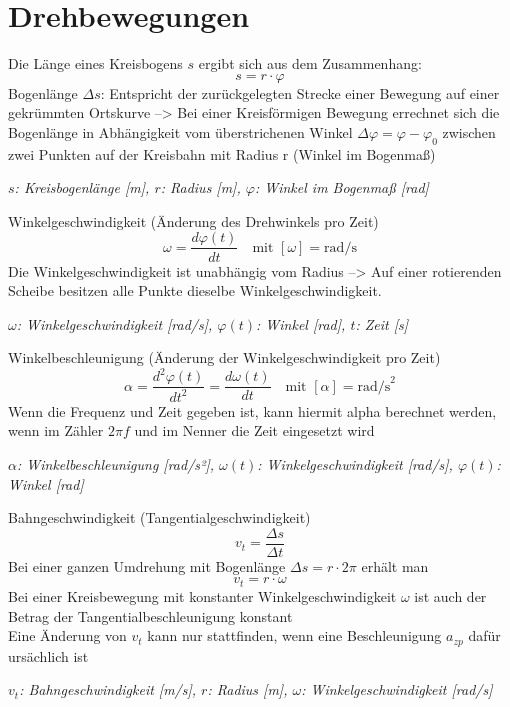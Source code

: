 \documentclass[a4paper,10pt]{article}
\newenvironment{displayformula}
{
	\begin{framed}
		\color{formulaColor}
	}
	{\end{framed}}
\newcommand{\formulalegend}[1]{%
	\par\vspace{0.5ex}%
	{{\color{legendColor}\RaggedRight\small\textit{#1}}}%
	\par\vspace{1.5ex}%
}
\begin{document}
\section{Drehbewegungen}


\begin{displayformula}
	Die Länge eines Kreisbogens \( s \) ergibt sich aus dem Zusammenhang:
	\[
	s = r \cdot \varphi 
	\]
	Bogenlänge $\Delta s$: Entspricht der zurückgelegten Strecke einer Bewegung auf einer gekrümmten Ortskurve --> Bei einer Kreisförmigen Bewegung errechnet sich die Bogenlänge in Abhängigkeit vom überstrichenen Winkel $\Delta \varphi = \varphi - \varphi_0$ zwischen zwei Punkten auf der Kreisbahn mit Radius r (Winkel im Bogenmaß)
\end{displayformula}
\formulalegend{
	\( s \): Kreisbogenlänge [m], \( r \): Radius [m], \( \varphi \): Winkel im Bogenmaß [rad]
}

\begin{displayformula}
	Winkelgeschwindigkeit (Änderung des Drehwinkels pro Zeit)
	\[
	\omega = \frac{d\varphi(t)}{dt} \quad \text{mit } [\omega] = \text{rad/s}
	\]
	Die Winkelgeschwindigkeit ist unabhängig vom Radius --> Auf einer rotierenden Scheibe besitzen alle Punkte dieselbe Winkelgeschwindigkeit.
\end{displayformula}
\formulalegend{
	\( \omega \): Winkelgeschwindigkeit [rad/s], \( \varphi(t) \): Winkel [rad], \( t \): Zeit [s]
}

\begin{displayformula}
	Winkelbeschleunigung (Änderung der Winkelgeschwindigkeit pro Zeit)
	\[
	\alpha = \frac{d^2 \varphi(t)}{dt^2} = \frac{d\omega(t)}{dt} \quad \text{mit } [\alpha] = \text{rad/s}^2
	\]
	Wenn die Frequenz und Zeit gegeben ist, kann hiermit alpha berechnet werden, wenn im Zähler $2 \pi f$ und im Nenner die Zeit eingesetzt wird
\end{displayformula}
\formulalegend{
	\( \alpha \): Winkelbeschleunigung [rad/s²], \( \omega(t) \): Winkelgeschwindigkeit [rad/s], \( \varphi(t) \): Winkel [rad]
}

\begin{displayformula}
	Bahngeschwindigkeit (Tangentialgeschwindigkeit)
	\[
	v_t = \frac{\Delta s}{\Delta t}
	\]
	Bei einer ganzen Umdrehung mit Bogenlänge $\Delta s = r \cdot 2 \pi$ erhält man
	\[
	v_t = r \cdot \omega
	\]
	Bei einer Kreisbewegung mit konstanter Winkelgeschwindigkeit $\omega$ ist auch der Betrag der Tangentialbeschleunigung konstant \\
	Eine Änderung von $v_t$ kann nur stattfinden, wenn eine Beschleunigung $a_{zp}$ dafür ursächlich ist
\end{displayformula}
\formulalegend{
	\( v_t \): Bahngeschwindigkeit [m/s], \( r \): Radius [m], \( \omega \): Winkelgeschwindigkeit [rad/s]
}
\end{document}
